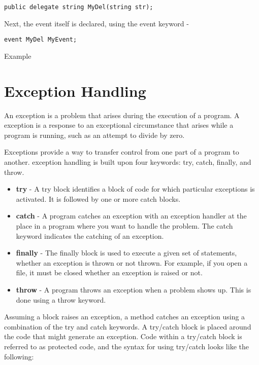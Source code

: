 \begin{lstlisting}[numbers=none]
	public delegate string MyDel(string str);
\end{lstlisting}

Next, the event itself is declared, using the event keyword -
\begin{lstlisting}[numbers=none]
	event MyDel MyEvent;
\end{lstlisting}

\noindent Example




\section{Exception Handling}
An exception is a problem that arises during the execution of a program. A {\cs} exception is a
response to an exceptional circumstance that arises while a program is running, such as an attempt
to divide by zero.

Exceptions provide a way to transfer control from one part of a program to another. {\cs} exception
handling is built upon four keywords: try, catch, finally, and throw.

\begin{itemize}
	\item \textbf{try} - A try block identifies a block of code for which particular exceptions is activated. It is
	followed by one or more catch blocks.
	\item \textbf{catch} - A program catches an exception with an exception handler at the place in a program
	where you want to handle the problem. The catch keyword indicates the catching of an
	exception.
	\item \textbf{finally} - The finally block is used to execute a given set of statements, whether an exception
	is thrown or not thrown. For example, if you open a file, it must be closed whether an
	exception is raised or not.
	\item \textbf{throw} - A program throws an exception when a problem shows up. This is done using a
	throw keyword.
\end{itemize}


Assuming a block raises an exception, a method catches an exception using a combination of the try
and catch keywords. A try/catch block is placed around the code that might generate an exception.
Code within a try/catch block is referred to as protected code, and the syntax for using try/catch
looks like the following:

